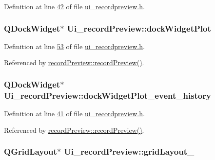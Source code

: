Definition at line \hyperlink{a00140_source_l00042}{42} of file \hyperlink{a00140_source}{ui\+\_\+recordpreview.\+h}.

\hypertarget{a00081_a07b76f17803ec09e0367b72938bbd097}{
\subsubsection[{dock\+Widget\+Plot}]{\setlength{\rightskip}{0pt plus 5cm}Q\+Dock\+Widget$\ast$ Ui\+\_\+record\+Preview\+::dock\+Widget\+Plot}}\label{a00081_a07b76f17803ec09e0367b72938bbd097}


Definition at line \hyperlink{a00140_source_l00053}{53} of file \hyperlink{a00140_source}{ui\+\_\+recordpreview.\+h}.



Referenced by \hyperlink{a00129_source_l00011}{record\+Preview\+::record\+Preview()}.

\hypertarget{a00081_a2a8f7ee8d4458dd20481c8a1c29ce185}{
\subsubsection[{dock\+Widget\+Plot\+\_\+event\+\_\+history}]{\setlength{\rightskip}{0pt plus 5cm}Q\+Dock\+Widget$\ast$ Ui\+\_\+record\+Preview\+::dock\+Widget\+Plot\+\_\+event\+\_\+history}}\label{a00081_a2a8f7ee8d4458dd20481c8a1c29ce185}


Definition at line \hyperlink{a00140_source_l00041}{41} of file \hyperlink{a00140_source}{ui\+\_\+recordpreview.\+h}.



Referenced by \hyperlink{a00129_source_l00011}{record\+Preview\+::record\+Preview()}.

\hypertarget{a00081_a4edfeb379ee365973f74b0e422fd9916}{
\subsubsection[{grid\+Layout\+\_\+3}]{\setlength{\rightskip}{0pt plus 5cm}Q\+Grid\+Layout$\ast$ Ui\+\_\+record\+Preview\+::grid\+Layout\+\_}}\label{a00081_a4edfeb379ee365973f74b0e422fd9916}


